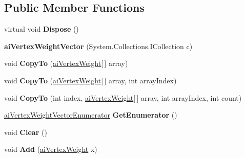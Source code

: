 \subsection*{Public Member Functions}
\begin{DoxyCompactItemize}
\item 
\hypertarget{classai_vertex_weight_vector_a7dcba156fb2abf5702811644df487176}{virtual void {\bfseries Dispose} ()}\label{classai_vertex_weight_vector_a7dcba156fb2abf5702811644df487176}

\item 
\hypertarget{classai_vertex_weight_vector_a022c6573949a8bab6eab16c018598df3}{{\bfseries ai\+Vertex\+Weight\+Vector} (System.\+Collections.\+I\+Collection c)}\label{classai_vertex_weight_vector_a022c6573949a8bab6eab16c018598df3}

\item 
\hypertarget{classai_vertex_weight_vector_aae62bb6fa5b7929a7a040d9030f65f4d}{void {\bfseries Copy\+To} (\hyperlink{structai_vertex_weight}{ai\+Vertex\+Weight}\mbox{[}$\,$\mbox{]} array)}\label{classai_vertex_weight_vector_aae62bb6fa5b7929a7a040d9030f65f4d}

\item 
\hypertarget{classai_vertex_weight_vector_a7e58d0340ce2b8e84513a73673449337}{void {\bfseries Copy\+To} (\hyperlink{structai_vertex_weight}{ai\+Vertex\+Weight}\mbox{[}$\,$\mbox{]} array, int array\+Index)}\label{classai_vertex_weight_vector_a7e58d0340ce2b8e84513a73673449337}

\item 
\hypertarget{classai_vertex_weight_vector_a0f34037603db147b8f9344b8f804549f}{void {\bfseries Copy\+To} (int index, \hyperlink{structai_vertex_weight}{ai\+Vertex\+Weight}\mbox{[}$\,$\mbox{]} array, int array\+Index, int count)}\label{classai_vertex_weight_vector_a0f34037603db147b8f9344b8f804549f}

\item 
\hypertarget{classai_vertex_weight_vector_a96ea4ca563df729c60f0a85455a0f317}{\hyperlink{classai_vertex_weight_vector_1_1ai_vertex_weight_vector_enumerator}{ai\+Vertex\+Weight\+Vector\+Enumerator} {\bfseries Get\+Enumerator} ()}\label{classai_vertex_weight_vector_a96ea4ca563df729c60f0a85455a0f317}

\item 
\hypertarget{classai_vertex_weight_vector_a692426083d3172ab7c335a508d6b56fc}{void {\bfseries Clear} ()}\label{classai_vertex_weight_vector_a692426083d3172ab7c335a508d6b56fc}

\item 
\hypertarget{classai_vertex_weight_vector_a1b6b24fd73e3523fb1ec45c7ad325f67}{void {\bfseries Add} (\hyperlink{structai_vertex_weight}{ai\+Vertex\+Weight} x)}\label{classai_vertex_weight_vector_a1b6b24fd73e3523fb1ec45c7ad325f67}


\end{DoxyCompactItemize}
